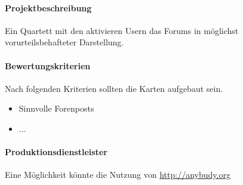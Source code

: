 \paragraph{Projektbeschreibung} Ein Quartett mit den aktivieren Usern das Forums in möglichst vorurteilsbehafteter Darstellung. 
\paragraph{Bewertungskriterien} Nach folgenden Kriterien sollten die Karten aufgebaut sein.
\begin{itemize}
	\item Sinnvolle Forenposts
	\item ...
\end{itemize}

\paragraph{Produktionsdienstleister} Eine Möglichkeit könnte die Nutzung von \url{http://anybudy.org}